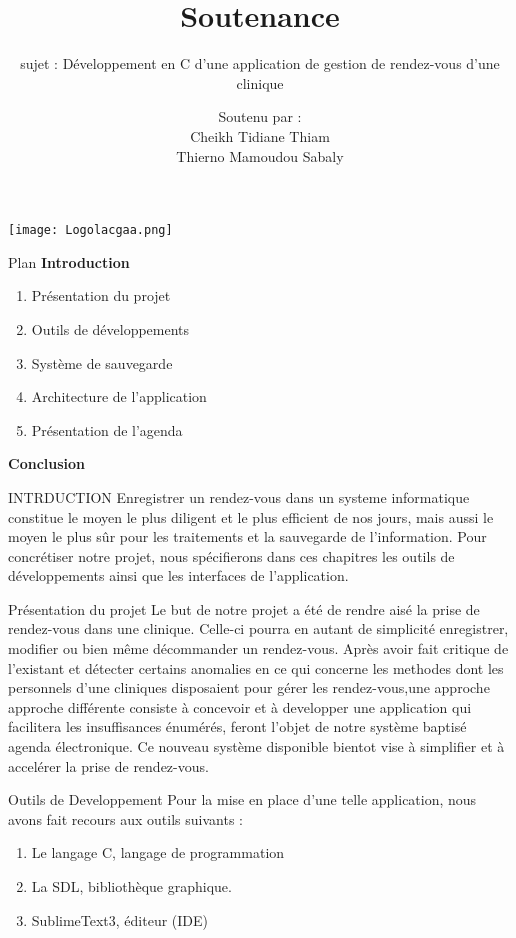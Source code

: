 \documentclass{beamer}
\title{Soutenance}
\subtitle{sujet : Développement en C d'une application de gestion de rendez-vous d'une clinique}
\institute[2017-2018]{Transmission des Données et Sécurité de l'Information}
\date{}
\author[L1TDSI]{Soutenu par : \\Cheikh Tidiane Thiam\\Thierno Mamoudou Sabaly}
\begin{document}
\begin{frame}[t]
\texttt{[image: Logolacgaa.png]}
	\titlepage
\end{frame}
\begin{frame}{Plan}
\textbf{Introduction}
\begin{enumerate}
\item Présentation du projet
\item Outils de développements
\item Système de sauvegarde
\item Architecture de l'application
\item Présentation de l'agenda
\end{enumerate}
\textbf{Conclusion}
\end{frame}
\begin{frame}{INTRDUCTION}
Enregistrer un rendez-vous dans un systeme informatique constitue le moyen le plus diligent et le plus efficient de nos jours, mais aussi le moyen le plus sûr pour les traitements et la sauvegarde de l'information. Pour concrétiser notre projet, nous spécifierons dans ces chapitres les outils de développements ainsi que les interfaces de l'application.
\end{frame}

\begin{frame}{Présentation du projet}
Le but de notre projet a été de rendre aisé la prise de rendez-vous dans une clinique. Celle-ci pourra en autant de simplicité enregistrer, modifier ou bien même décommander un rendez-vous. Après avoir fait critique de  l'existant et détecter certains anomalies en ce qui concerne les methodes dont les personnels d'une cliniques disposaient pour gérer les rendez-vous,une approche approche différente consiste à concevoir et à developper une application qui facilitera les insuffisances énumérés, feront l'objet de notre système baptisé agenda électronique.
Ce nouveau système disponible bientot vise à simplifier et à accelérer la prise de rendez-vous.
\end{frame}

\begin{frame}{Outils de Developpement}
Pour la mise en place d'une telle application, nous avons fait recours aux outils suivants : 
\begin{enumerate}
\item Le langage C, langage de programmation \pause
\item La SDL, bibliothèque graphique. \pause
\item SublimeText3, éditeur (IDE)
\end{enumerate}
\end{frame}
\end{document}
